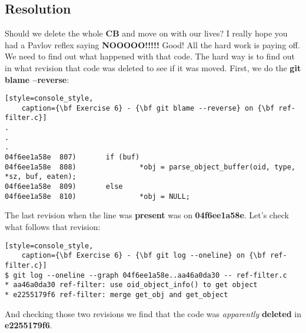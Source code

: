 \subsection*{Resolution}
Should we delete the whole {\bf CB} and move on with our lives? I really hope you had a Pavlov reflex saying {\bf NOOOOO!!!!!}
Good! All the hard work is paying off. We need to find out what happened with that code. The hard way is to find out
in what revision that code was deleted to see if it was moved. First, we do the {\bf git blame --reverse}:

\begin{lstlisting}[style=console_style,
	caption={\bf Exercise 6} - {\bf git blame --reverse} on {\bf ref-filter.c}]
.
.
.
04f6ee1a58e  807)       if (buf)
04f6ee1a58e  808)               *obj = parse_object_buffer(oid, type, *sz, buf, eaten);
04f6ee1a58e  809)       else
04f6ee1a58e  810)               *obj = NULL;
\end{lstlisting}

The last revision when the line was {\bf present} was on {\bf 04f6ee1a58e}. Let's check what follows that revision:
\begin{lstlisting}[style=console_style,
	caption={\bf Exercise 6} - {\bf git log --oneline} on {\bf ref-filter.c}]
$ git log --oneline --graph 04f6ee1a58e..aa46a0da30 -- ref-filter.c
* aa46a0da30 ref-filter: use oid_object_info() to get object
* e2255179f6 ref-filter: merge get_obj and get_object
\end{lstlisting}

And checking those two revisions we find that the code was {\it apparently} {\bf deleted} in {\bf e2255179f6}.


